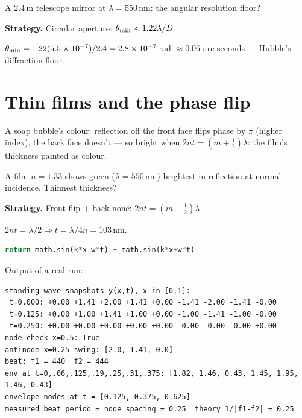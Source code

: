 \begin{example}\label{ex:rayleigh}
A $2.4$\,m telescope mirror at $\lambda=550$\,nm: the angular
resolution floor?
\par\smallskip
\textbf{Strategy.} Circular aperture: $\theta_{\rm min}\approx1.22\lambda/D$.
\begin{solution}
$\theta_{\rm min}=1.22(5.5\times10^{-7})/2.4=2.8\times10^{-7}$\,rad
$\approx0.06$ arc-seconds --- Hubble's diffraction floor. \checkmark
\end{solution}
\end{example}

\section{Thin films and the phase flip}\label{sec:wav-film}

A soap bubble's colour: reflection off the front face flips phase by
$\pi$ (higher index), the back face doesn't --- so bright when
$2nt=(m+\tfrac12)\lambda$: the film's thickness painted as colour.

\begin{example}\label{ex:film}
A film $n=1.33$ shows green ($\lambda=550$\,nm) brightest in
reflection at normal incidence. Thinnest thickness?
\par\smallskip
\textbf{Strategy.} Front flip + back none: $2nt=(m+\tfrac12)\lambda$.
\begin{solution}
$2nt=\lambda/2\Rightarrow t=\lambda/4n=103$\,nm. \checkmark
\end{solution}
\end{example}

\begin{lstlisting}[language=Python,caption={\texttt{code/ch16\_superposition.py} --- standing-wave snapshots + beat envelope.},label={lst:sup}]
return math.sin(k*x-w*t) + math.sin(k*x+w*t)
\end{lstlisting}

Output of a real run:
\begin{lstlisting}[numbers=none]
standing wave snapshots y(x,t), x in [0,1]:
 t=0.000: +0.00 +1.41 +2.00 +1.41 +0.00 -1.41 -2.00 -1.41 -0.00
 t=0.125: +0.00 +1.00 +1.41 +1.00 +0.00 -1.00 -1.41 -1.00 -0.00
 t=0.250: +0.00 +0.00 +0.00 +0.00 +0.00 -0.00 -0.00 -0.00 +0.00
node check x=0.5: True
antinode x=0.25 swing: [2.0, 1.41, 0.0]
beat: f1 = 440  f2 = 444
env at t=0,.06,.125,.19,.25,.31,.375: [1.82, 1.46, 0.43, 1.45, 1.95, 1.46, 0.43]
envelope nodes at t = [0.125, 0.375, 0.625]
measured beat period = node spacing = 0.25  theory 1/|f1-f2| = 0.25
\end{lstlisting}

